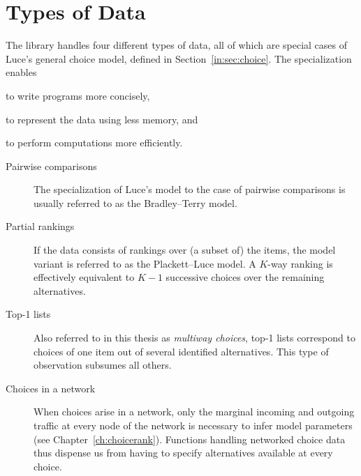 \section{Types of Data}

The library handles four different types of data, all of which are special cases of Luce's general choice model, defined in Section~\ref{in:sec:choice}.
The specialization enables
\begin{enuminline}
\item to write programs more concisely,
\item to represent the data using less memory, and
\item to perform computations more efficiently.
\end{enuminline}

\begin{description}
\item[Pairwise comparisons] The specialization of Luce's model to the case of pairwise comparisons is usually referred to as the Bradley--Terry model.

\item[Partial rankings] If the data consists of rankings over (a subset of) the items, the model variant is referred to as the Plackett--Luce model.
A $K$-way ranking is effectively equivalent to $K-1$ successive choices over the remaining alternatives.

\item[Top-1 lists] Also referred to in this thesis as \emph{multiway choices}, top-1 lists correspond to choices of one item out of several identified alternatives.
This type of observation subsumes all others.

\item[Choices in a network] When choices arise in a network, only the marginal incoming and outgoing traffic at every node of the network is necessary to infer model parameters (see Chapter~\ref{ch:choicerank}).
Functions handling networked choice data thus dispense us from having to specify alternatives available at every choice.
\end{description}
